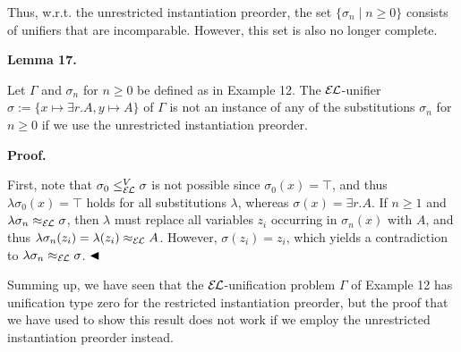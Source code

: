 \documentclass[10pt,a4paper]{amsart}
\begin{document}
 
 
Thus, w.r.t. the unrestricted instantiation preorder, the set $\{\sigma_{n}\mid n\geq 0\}$ consists of unifiers that are incomparable. However, this set is also no longer complete.\par
 
 
 
\par\medskip\noindent\textbf{Lemma 17.}\par
 
 
Let $\Gamma$ and $\sigma_{n}$ for $n\geq 0$ be defined as in Example 12. The $\mathcal{E\mkern-1.618muL}$-unifier $\sigma:=\{x\mapsto\exists r.A,y\mapsto A\}$ of $\Gamma$ is not an instance of any of the substitutions $\sigma_{n}$ for $n\geq 0$ if we use the unrestricted instantiation preorder.\par
 
 
 
 
 
\par\medskip\noindent\textbf{Proof.}\par
 
 
First, note that $\sigma_{0}\leq_{\mathcal{E\mkern-1.618muL}}^{V}\sigma$ is not possible since $\sigma_{0}(x)=\top$, and thus $\lambda\sigma_{0}(x)=\top$ holds for all substitutions $\lambda$, whereas $\sigma(x)=\exists r.A$. If $n\geq 1$ and $\lambda\sigma_{n}\approx_{\mathcal{E\mkern-1.618muL}}\sigma$, then $\lambda$ must replace all variables $z_{i}$ occurring in $\sigma_{n}(x)$ with $A$, and thus $\lambda\sigma_{n}(z_{i})=\lambda(z_{i})\approx_{\mathcal{E\mkern-1.618muL}}A$. However, $\sigma(z_{i})=z_{i}$, which yields a contradiction to $\lambda\sigma_{n}\approx_{\mathcal{E\mkern-1.618muL}}\sigma$. $\hfill\blacktriangleleft$\par
 
 
 
Summing up, we have seen that the $\mathcal{E\mkern-1.618muL}$-unification problem $\Gamma$ of Example 12 has unification type zero for the restricted instantiation preorder, but the proof that we have used to show this result does not work if we employ the unrestricted instantiation preorder instead.\par
 
\end{document}
